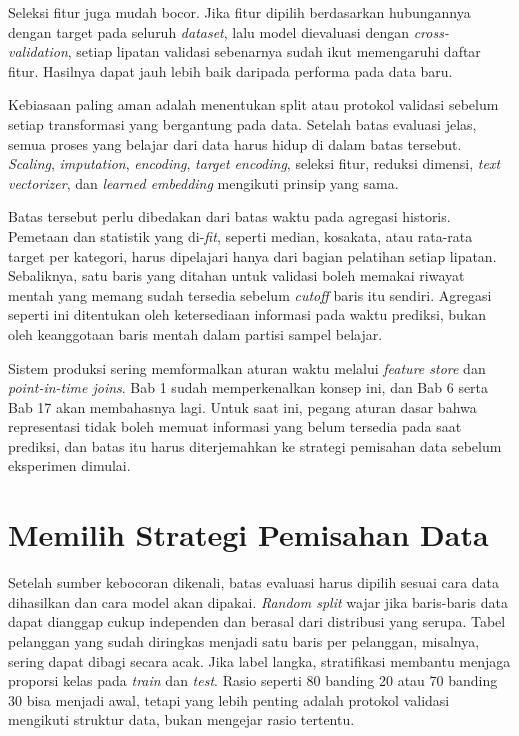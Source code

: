 Seleksi fitur juga mudah bocor. Jika fitur dipilih berdasarkan hubungannya dengan target pada seluruh \emph{dataset}, lalu model dievaluasi dengan \emph{cross-validation}, setiap lipatan validasi sebenarnya sudah ikut memengaruhi daftar fitur. Hasilnya dapat jauh lebih baik daripada performa pada data baru.

Kebiasaan paling aman adalah menentukan split atau protokol validasi sebelum setiap transformasi yang bergantung pada data. Setelah batas evaluasi jelas, semua proses yang belajar dari data harus hidup di dalam batas tersebut. \emph{Scaling}, \emph{imputation}, \emph{encoding}, \emph{target encoding}, seleksi fitur, reduksi dimensi, \emph{text vectorizer}, dan \emph{learned embedding} mengikuti prinsip yang sama.

Batas tersebut perlu dibedakan dari batas waktu pada agregasi historis. Pemetaan dan statistik yang di-\emph{fit}, seperti median, kosakata, atau rata-rata target per kategori, harus dipelajari hanya dari bagian pelatihan setiap lipatan. Sebaliknya, satu baris yang ditahan untuk validasi boleh memakai riwayat mentah yang memang sudah tersedia sebelum \emph{cutoff} baris itu sendiri. Agregasi seperti ini ditentukan oleh ketersediaan informasi pada waktu prediksi, bukan oleh keanggotaan baris mentah dalam partisi sampel belajar.

Sistem produksi sering memformalkan aturan waktu melalui \emph{feature store} dan \emph{point-in-time joins}. Bab 1 sudah memperkenalkan konsep ini, dan Bab 6 serta Bab 17 akan membahasnya lagi. Untuk saat ini, pegang aturan dasar bahwa representasi tidak boleh memuat informasi yang belum tersedia pada saat prediksi, dan batas itu harus diterjemahkan ke strategi pemisahan data sebelum eksperimen dimulai.

\section{Memilih Strategi Pemisahan Data}\label{memilih-strategi-pemisahan-data}

Setelah sumber kebocoran dikenali, batas evaluasi harus dipilih sesuai cara data dihasilkan dan cara model akan dipakai. \emph{Random split} wajar jika baris-baris data dapat dianggap cukup independen dan berasal dari distribusi yang serupa. Tabel pelanggan yang sudah diringkas menjadi satu baris per pelanggan, misalnya, sering dapat dibagi secara acak. Jika label langka, stratifikasi membantu menjaga proporsi kelas pada \emph{train} dan \emph{test}. Rasio seperti 80 banding 20 atau 70 banding 30 bisa menjadi awal, tetapi yang lebih penting adalah protokol validasi mengikuti struktur data, bukan mengejar rasio tertentu.

